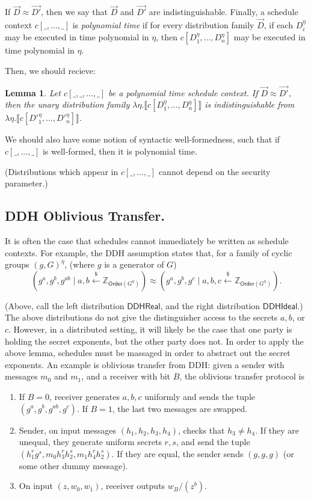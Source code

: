 \documentclass{article}
\newtheorem{lemma}{Lemma}
\begin{document}
If $\vec{D} \approx \vec{D'}$, then we say that $\vec{D}$ and $\vec{D'}$ are indistinguishable.
Finally, a schedule context $c[\_, \dots, \_]$ is \emph{polynomial time} if for every distribution family $\vec{D}$, if each $D_i^\eta$ may be executed in time polynomial in $\eta$, then $c[D_1^\eta, \dots, D_n^\eta]$ may be executed in time polynomial in $\eta$.

Then, we should recieve:
\begin{lemma}
    Let $c[\_, \_, \dots, \_]$ be a polynomial time schedule context. If $\vec{D} \approx \vec{D'}$, then the unary distribution family $\lambda \eta. \llbracket c[D_1^\eta, \dots, D_n^\eta] \rrbracket$ is indistinguishable from $\lambda \eta. \llbracket c[D'^\eta_1, \dots, D'^\eta_n] \rrbracket$.
\end{lemma}

We should also have some notion of syntactic well-formedness, such that if $c[\_, \dots, \_]$ is well-formed, then it is polynomial time.

(Distributions which appear in $c[\_, \dots, \_]$ cannot depend on the security parameter.)

\subsection{DDH Oblivious Transfer.}
It is often the case that schedules cannot immediately be written as schedule contexts. For example, the DDH assumption states that, for a family of cyclic groups $(g,G)^\eta$, (where $g$ is a generator of $G$)
\[(g^a, g^b, g^{ab} \mid a,b \xleftarrow{\$} \mathbb{Z}_{\mathsf{Order}(G^\eta)}) \approx (g^a, g^b, g^c \mid a,b,c \xleftarrow{\$} \mathbb{Z}_{\textsf{Order}(G^\eta)}).\]

(Above, call the left distribution $\mathsf{DDHReal}$, and the right distribution $\mathsf{DDHIdeal}$.)
The above distributions do not give the distinguisher access to the secrets $a,b$, or $c$. However, in a distributed setting, it will likely be the case that one party is holding the secret exponents, but the other party does not. In order to apply the above lemma, schedules must be massaged in order to abstract out the secret exponents. An example is oblivious transfer from DDH: given a sender with messages $m_0$ and $m_1$, and a receiver with bit $B$, the oblivious transfer protocol is


\begin{enumerate}
    \item If $B=0$, receiver generates $a,b,c$ uniformly and sends the tuple $(g^a, g^b, g^{ab}, g^c)$. If $B=1$, the last two messages are swapped.
    \item Sender, on input messages $(h_1, h_2, h_3, h_4)$, checks that $h_3 \neq h_4$. If they are unequal, they generate uniform secrets $r,s$, and send the tuple $(h_1^r g^s, m_0 h_3^r h_2^s, m_1 h_4^r h_2^s)$. If they are equal, the sender sends $(g, g, g)$ (or some other dummy message).
    \item On input $(z, w_0, w_1)$, receiver outputs $w_B / (z^b)$.
\end{enumerate}
\end{document}
